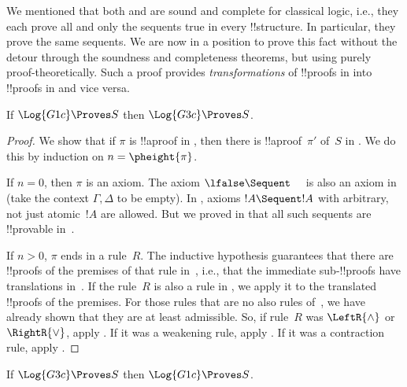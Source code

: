 \documentclass[../../../include/open-logic-section]{subfiles}
\begin{document}


We mentioned that both  and  are sound and complete
for classical logic, i.e., they each prove all and only the sequents
true in every !!{structure}. In particular, they prove the same
sequents. We are now in a position to prove this fact without the
detour through the soundness and completeness theorems, but using
purely proof-theoretically. Such a proof provides
\emph{transformations} of !!{proof}s in  into !!{proof}s in
 and vice versa.

\begin{prop}
If $\Log{G1c} \Proves S$ then $\Log{G3c} \Proves S$.
\end{prop}

\begin{proof}
  We show that if $\pi$ is !!a{proof} in , then there is
  !!a{proof}~$\pi'$ of~$S$ in . We do this by induction on $n
  = \pheight{\pi}$.

  If $n = 0$, then $\pi$ is an axiom. The axiom $\lfalse \Sequent
  \quad$ is also an axiom in~ (take the context $\Gamma,
  \Delta$ to be empty). In , axioms $!A \Sequent !A$ with
  arbitrary, not just atomic~$!A$ are allowed. But we proved in
   that all such sequents are !!{provable}
  in~.
  
  If $n>0$, $\pi$ ends in a rule~$R$. The inductive hypothesis
  guarantees that there are !!{proof}s of the premises of that rule
  in~, i.e., that the immediate sub-!!{proof}s have
  translations in~. If the rule~$R$ is also a rule in
  , we apply it to the translated !!{proof}s of the premises.
  For those rules that are no also rules of~, we have already
  shown that they are at least admissible. So, if rule~$R$ was
  $\LeftR{\land}$ or $\RightR{\lor}$, apply
  . If it was a weakening rule, apply
  . If it was a contraction rule, apply
  .
\end{proof}

\begin{prop}
If $\Log{G3c} \Proves S$ then $\Log{G1c} \Proves S$.
\end{prop}
\end{document}
